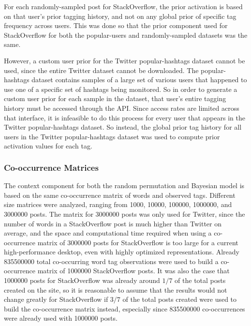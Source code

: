 \documentclass[man,floatsintext,donotrepeattitle]{apa6}
\begin{document}
For each randomly-sampled post for StackOverflow, the prior activation is based on that user's prior tagging history, and not on any global prior of specific tag frequency across users.
This was done so that the prior component used for StackOverflow for both the popular-users and randomly-sampled datasets was the same.

However, a custom user prior for the Twitter popular-hashtags dataset cannot be used, since the entire Twitter dataset cannot be downloaded.
The popular-hashtags dataset contains samples of a large set of various users that happened to use one of a specific set of hashtags being monitored.
So in order to generate a custom user prior for each sample in the dataset, that user's entire tagging history must be accessed through the API.
Since access rates are limited across that interface, it is infeasible to do this process for every user that appears in the Twitter popular-hashtags dataset.
So instead, the global prior tag history for all users in the Twitter popular-hashtags dataset was used to compute prior activation values for each tag.

\subsubsection{Co-occurrence Matrices}

The context component for both the random permutation and Bayesian model is based on the same co-occurrence matrix of words and observed tags.
Different size matrices were analyzed, ranging from \num{1000}, \num{10000}, \num{100000}, \num{1000000}, and \num{3000000} posts.
The matrix for \num{3000000} posts was only used for Twitter, since the number of words in a StackOverflow post is much higher than Twitter on average,
and the space and computational time required when using a co-occurrence matrix of \num{3000000} posts for StackOverflow is too large for a current high-performance desktop, even with highly optimized representations.
Already \num{835500000} total co-occurring word tag observations were used to build a co-occurrence matrix of \num{1000000} StackOverflow posts.
It was also the case that \num{1000000} posts for StackOverflow was already around $1/7$ of the total posts created on the site,
so it is reasonable to assume that the results would not change greatly for StackOverflow if $3/7$ of the total posts created were used to build the co-occurrence matrix instead,
especially since \num{835500000} co-occurrences were already used with \num{1000000} posts.
\end{document}

